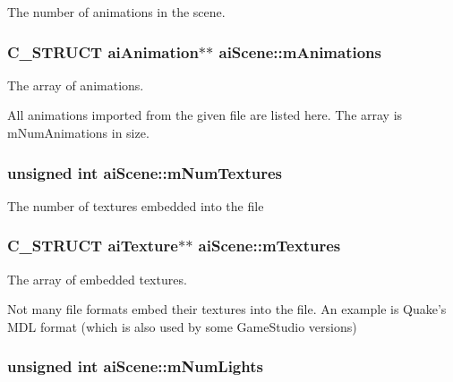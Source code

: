 The number of animations in the scene. \hypertarget{structai_scene_b76fb8f38c2e7365ccce42d565b62b25}{
\subsubsection[mAnimations]{\setlength{\rightskip}{0pt plus 5cm}C\_\-STRUCT {\bf aiAnimation}$\ast$$\ast$ {\bf aiScene::mAnimations}}}
\label{structai_scene_b76fb8f38c2e7365ccce42d565b62b25}


The array of animations.

All animations imported from the given file are listed here. The array is mNumAnimations in size. \hypertarget{structai_scene_0d61a5439edd7223097b48aea57c47dd}{
\subsubsection[mNumTextures]{\setlength{\rightskip}{0pt plus 5cm}unsigned int {\bf aiScene::mNumTextures}}}
\label{structai_scene_0d61a5439edd7223097b48aea57c47dd}


The number of textures embedded into the file \hypertarget{structai_scene_0fd0d29fbc439e3715b4975ccb68d2d3}{
\subsubsection[mTextures]{\setlength{\rightskip}{0pt plus 5cm}C\_\-STRUCT {\bf aiTexture}$\ast$$\ast$ {\bf aiScene::mTextures}}}
\label{structai_scene_0fd0d29fbc439e3715b4975ccb68d2d3}


The array of embedded textures.

Not many file formats embed their textures into the file. An example is Quake's MDL format (which is also used by some GameStudio versions) \hypertarget{structai_scene_0c90fc5f15b979e0bb0d3e8f1e246307}{
\subsubsection[mNumLights]{\setlength{\rightskip}{0pt plus 5cm}unsigned int {\bf aiScene::mNumLights}}}
\label{structai_scene_0c90fc5f15b979e0bb0d3e8f1e246307}


